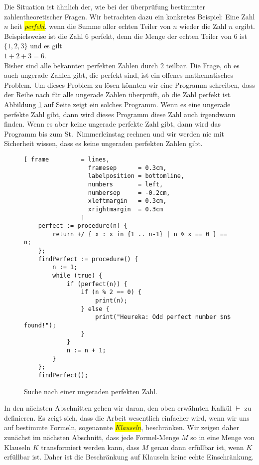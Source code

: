 Die Situation ist \"{a}hnlich der, wie bei der \"{u}berpr\"{u}fung bestimmter zahlentheoretischer
Fragen.  Wir betrachten dazu ein konkretes Beispiel: Eine Zahl $n$ hei\3t \colorbox{yellow}{\emph{perfekt}},
wenn die Summe aller echten Teiler von $n$ wieder die Zahl $n$ ergibt.  Beispielsweise ist
die Zahl $6$ perfekt, denn die Menge der echten Teiler von $6$ ist $\{1,2,3\}$ und es gilt
\\[0.2cm]
\hspace*{1.3cm}
$1 + 2 + 3 = 6$.
\\[0.2cm]
Bisher sind alle bekannten perfekten Zahlen durch $2$ teilbar.  Die Frage, ob es auch
ungerade Zahlen gibt, die perfekt sind, ist ein offenes mathematisches Problem.  Um dieses
Problem zu l\"{o}sen k\"{o}nnten wir eine Programm schreiben, dass der Reihe nach f\"{u}r alle
ungerade Zahlen \"{u}berpr\"{u}ft, ob die Zahl perfekt ist.  Abbildung \ref{fig:find-perfect.stlx}
auf Seite \pageref{fig:find-perfect.stlx} zeigt ein solches Programm.  Wenn es eine ungerade perfekte Zahl
gibt, dann wird dieses Programm diese Zahl auch irgendwann finden.  Wenn es aber keine
ungerade perfekte Zahl gibt, dann wird das Programm bis zum St.~Nimmerleinstag rechnen und
wir werden nie mit Sicherheit wissen, dass es keine ungeraden perfekten Zahlen gibt.

\begin{figure}[!ht]
  \centering
\begin{Verbatim}[ frame         = lines, 
                  framesep      = 0.3cm, 
                  labelposition = bottomline,
                  numbers       = left,
                  numbersep     = -0.2cm,
                  xleftmargin   = 0.3cm,
                  xrightmargin  = 0.3cm
                ]
    perfect := procedure(n) {
        return +/ { x : x in {1 .. n-1} | n % x == 0 } == n;
    };    
    findPerfect := procedure() {
        n := 1;
        while (true) {
            if (perfect(n)) {
                if (n % 2 == 0) {
                    print(n);
                } else {
                    print("Heureka: Odd perfect number $n$ found!");
                }
            } 
            n := n + 1;
        }
    };
    findPerfect();
\end{Verbatim}
\vspace*{-0.3cm}
  \caption{Suche nach einer ungeraden perfekten Zahl.}
  \label{fig:find-perfect.stlx}
\end{figure} 


In den n\"{a}chsten Abschnitten gehen wir daran, den oben erw\"{a}hnten Kalk\"{u}l $\vdash$ zu definieren.
Es zeigt sich, dass die Arbeit wesentlich einfacher wird, wenn wir uns auf bestimmte
Formeln, sogenannte \colorbox{yellow}{\emph{Klauseln}}, beschr\"{a}nken.  Wir zeigen daher zun\"{a}chst im n\"{a}chsten
Abschnitt, dass jede Formel-Menge $M$ so in eine Menge von Klauseln $K$ transformiert
werden kann, dass $M$ genau dann erf\"{u}llbar ist, wenn $K$ erf\"{u}llbar ist.  Daher ist die
Beschr\"{a}nkung auf Klauseln keine echte Einschr\"{a}nkung.


